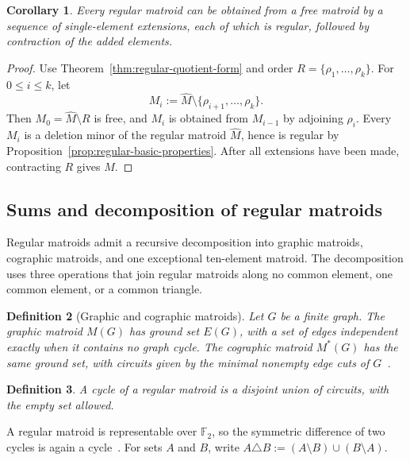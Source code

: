 \documentclass[11pt]{article}
\numberwithin{equation}{section}
\newtheorem{definition}{Definition}[section]
\newtheorem{corollary}[definition]{Corollary}
\theoremstyle{remark}
\begin{document}
\begin{corollary}
\label{cor:regular-extension-chain}
Every regular matroid can be obtained from a free matroid by a sequence of
single-element extensions, each of which is regular, followed by contraction
of the added elements.
\end{corollary}

\begin{proof}
Use Theorem~\ref{thm:regular-quotient-form} and order
$R=\{\rho_1,\ldots,\rho_k\}$. For $0\leq i\leq k$, let
\begin{equation}
    M_i
    :=
    \widehat M\setminus
    \{\rho_{i+1},\ldots,\rho_k\}.
\end{equation}
Then $M_0=\widehat M\setminus R$ is free, and $M_i$ is obtained from
$M_{i-1}$ by adjoining $\rho_i$. Every $M_i$ is a deletion minor of the
regular matroid $\widehat M$, hence is regular by
Proposition~\ref{prop:regular-basic-properties}. After all extensions have
been made, contracting $R$ gives $M$.
\end{proof}


\subsection{Sums and decomposition of regular matroids}
\label{subsec:regular-matroid-sums}

Regular matroids admit a recursive decomposition into graphic matroids,
cographic matroids, and one exceptional ten-element matroid. The decomposition
uses three operations that join regular matroids along no common element, one
common element, or a common triangle.

\begin{definition}[Graphic and cographic matroids]
\label{def:graphic-cographic}
Let $G$ be a finite graph. The \emph{graphic matroid} $M(G)$ has ground set
$E(G)$, with a set of edges independent exactly when it contains no graph
cycle. The \emph{cographic matroid} $M^*(G)$ has the same ground set, with
circuits given by the minimal nonempty edge cuts of $G$~\cite{Oxley2011}.
\end{definition}

\begin{definition}
\label{def:matroid-cycle}
A \emph{cycle} of a regular matroid is a disjoint union of circuits, with the
empty set allowed.
\end{definition}

A regular matroid is representable over $\mathbb F_2$, so the symmetric
difference of two cycles is again a cycle~\cite{Seymour1980,Oxley2011}. For
sets $A$ and $B$, write
$A\triangle B:=(A\setminus B)\cup(B\setminus A)$.
\end{document}
